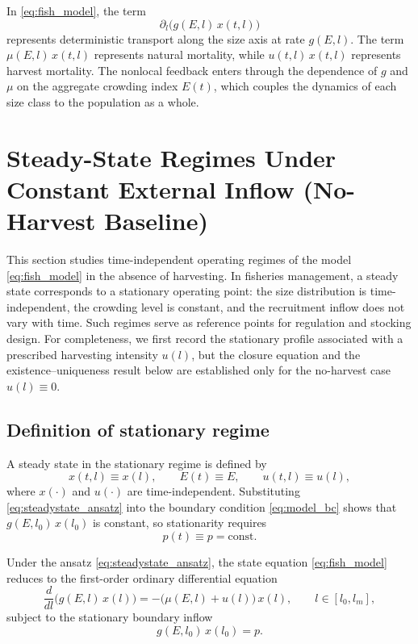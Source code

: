 \documentclass[pdflatex,sn-mathphys-num]{sn-jnl}
\theoremstyle{thmstyleone}
\theoremstyle{definition}
\theoremstyle{remark}
\begin{document}
In \eqref{eq:fish_model}, the term
\[
\partial_l\bigl(g(E,l)\,x(t,l)\bigr)
\]
represents deterministic transport along the size axis at rate $g(E,l)$.
The term $\mu(E,l)\,x(t,l)$ represents natural mortality, while
$u(t,l)\,x(t,l)$ represents harvest mortality. The nonlocal feedback enters
through the dependence of $g$ and $\mu$ on the aggregate crowding index $E(t)$,
which couples the dynamics of each size class to the population as a whole.

\section{Steady-State Regimes Under Constant External Inflow (No-Harvest Baseline)}
\label{sec:steady_state}

This section studies time-independent operating regimes of the model
\eqref{eq:fish_model} in the absence of harvesting. In fisheries management, a
steady state corresponds to a stationary operating point: the size distribution
is time-independent, the crowding level is constant, and the recruitment inflow
does not vary with time. Such regimes serve as reference points for regulation
and stocking design.
For completeness, we first record the stationary profile
associated with a prescribed harvesting intensity $u(l)$, but the closure
equation and the existence--uniqueness result below are established only for the
no-harvest case $u(l)\equiv 0$.

\subsection{Definition of stationary regime}\label{subsec:ss_def}

A steady state in the stationary regime is defined by
\begin{equation}\label{eq:steadystate_ansatz}
x(t,l)\equiv x(l),\qquad E(t)\equiv E,\qquad u(t,l)\equiv u(l),
\end{equation}
where $x(\cdot)$ and $u(\cdot)$ are time-independent. Substituting
\eqref{eq:steadystate_ansatz} into the boundary condition \eqref{eq:model_bc}
shows that $g(E,l_0)\,x(l_0)$ is constant, so stationarity requires
\begin{equation}\label{eq:p_constant}
p(t)\equiv p=\mathrm{const}.
\end{equation}

Under the ansatz \eqref{eq:steadystate_ansatz}, the state equation
\eqref{eq:fish_model} reduces to the first-order ordinary differential equation
\begin{equation}\label{eq:ss_ode_general}
\frac{d}{dl}\Big(g(E,l)\,x(l)\Big)
=
-\big(\mu(E,l)+u(l)\big)\,x(l),
\qquad l\in[l_0,l_m],
\end{equation}
subject to the stationary boundary inflow
\[
g(E,l_0)\,x(l_0)=p.
\]
\end{document}
